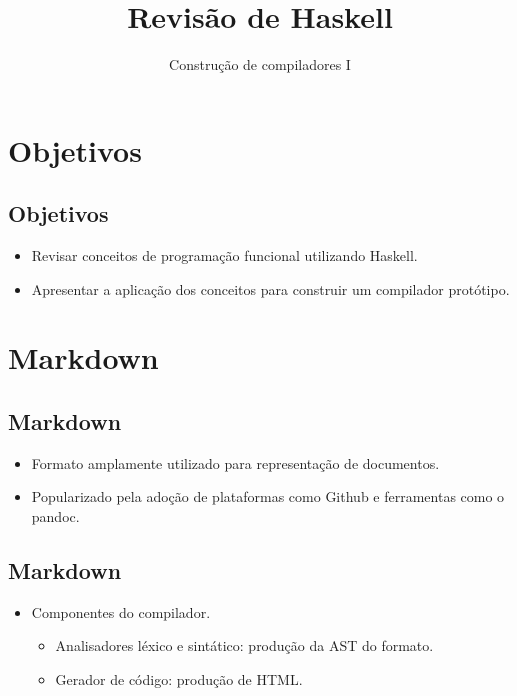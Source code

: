 \documentclass[11pt]{article}
\author{Construção de compiladores I}
\date{}
\title{Revisão de Haskell}
\begin{document}
\maketitle
\section*{Objetivos}
\label{sec:org21b0edc}

\subsection*{Objetivos}
\label{sec:org1b4ca65}

\begin{itemize}
\item Revisar conceitos de programação funcional utilizando Haskell.

\item Apresentar a aplicação dos conceitos para construir um compilador protótipo.
\end{itemize}
\section*{Markdown}
\label{sec:org93740e3}

\subsection*{Markdown}
\label{sec:org3cf2e35}

\begin{itemize}
\item Formato amplamente utilizado para representação de documentos.

\item Popularizado pela adoção de plataformas como Github e 
ferramentas como o pandoc.
\end{itemize}
\subsection*{Markdown}
\label{sec:orga6f8a7a}

\begin{itemize}
\item Componentes do compilador.
\begin{itemize}
\item Analisadores léxico e sintático: produção da AST do formato.

\item Gerador de código: produção de HTML.
\end{itemize}
\end{itemize}
\end{document}
